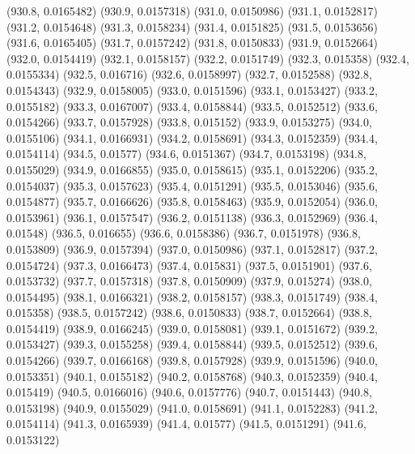 {					(930.8, 0.0165482)
					(930.9, 0.0157318)
					(931.0, 0.0150986)
					(931.1, 0.0152817)
					(931.2, 0.0154648)
					(931.3, 0.0158234)
					(931.4, 0.0151825)
					(931.5, 0.0153656)
					(931.6, 0.0165405)
					(931.7, 0.0157242)
					(931.8, 0.0150833)
					(931.9, 0.0152664)
					(932.0, 0.0154419)
					(932.1, 0.0158157)
					(932.2, 0.0151749)
					(932.3, 0.015358)
					(932.4, 0.0155334)
					(932.5, 0.016716)
					(932.6, 0.0158997)
					(932.7, 0.0152588)
					(932.8, 0.0154343)
					(932.9, 0.0158005)
					(933.0, 0.0151596)
					(933.1, 0.0153427)
					(933.2, 0.0155182)
					(933.3, 0.0167007)
					(933.4, 0.0158844)
					(933.5, 0.0152512)
					(933.6, 0.0154266)
					(933.7, 0.0157928)
					(933.8, 0.015152)
					(933.9, 0.0153275)
					(934.0, 0.0155106)
					(934.1, 0.0166931)
					(934.2, 0.0158691)
					(934.3, 0.0152359)
					(934.4, 0.0154114)
					(934.5, 0.01577)
					(934.6, 0.0151367)
					(934.7, 0.0153198)
					(934.8, 0.0155029)
					(934.9, 0.0166855)
					(935.0, 0.0158615)
					(935.1, 0.0152206)
					(935.2, 0.0154037)
					(935.3, 0.0157623)
					(935.4, 0.0151291)
					(935.5, 0.0153046)
					(935.6, 0.0154877)
					(935.7, 0.0166626)
					(935.8, 0.0158463)
					(935.9, 0.0152054)
					(936.0, 0.0153961)
					(936.1, 0.0157547)
					(936.2, 0.0151138)
					(936.3, 0.0152969)
					(936.4, 0.01548)
					(936.5, 0.016655)
					(936.6, 0.0158386)
					(936.7, 0.0151978)
					(936.8, 0.0153809)
					(936.9, 0.0157394)
					(937.0, 0.0150986)
					(937.1, 0.0152817)
					(937.2, 0.0154724)
					(937.3, 0.0166473)
					(937.4, 0.015831)
					(937.5, 0.0151901)
					(937.6, 0.0153732)
					(937.7, 0.0157318)
					(937.8, 0.0150909)
					(937.9, 0.015274)
					(938.0, 0.0154495)
					(938.1, 0.0166321)
					(938.2, 0.0158157)
					(938.3, 0.0151749)
					(938.4, 0.015358)
					(938.5, 0.0157242)
					(938.6, 0.0150833)
					(938.7, 0.0152664)
					(938.8, 0.0154419)
					(938.9, 0.0166245)
					(939.0, 0.0158081)
					(939.1, 0.0151672)
					(939.2, 0.0153427)
					(939.3, 0.0155258)
					(939.4, 0.0158844)
					(939.5, 0.0152512)
					(939.6, 0.0154266)
					(939.7, 0.0166168)
					(939.8, 0.0157928)
					(939.9, 0.0151596)
					(940.0, 0.0153351)
					(940.1, 0.0155182)
					(940.2, 0.0158768)
					(940.3, 0.0152359)
					(940.4, 0.015419)
					(940.5, 0.0166016)
					(940.6, 0.0157776)
					(940.7, 0.0151443)
					(940.8, 0.0153198)
					(940.9, 0.0155029)
					(941.0, 0.0158691)
					(941.1, 0.0152283)
					(941.2, 0.0154114)
					(941.3, 0.0165939)
					(941.4, 0.01577)
					(941.5, 0.0151291)
					(941.6, 0.0153122)
}
